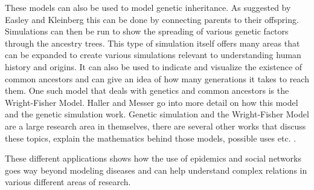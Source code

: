 These models can also be used to model genetic inheritance. As suggested by
Easley and Kleinberg \cite{networks} this can be done by connecting parents to their offspring.
Simulations can then be run to show the spreading of various genetic factors through
the ancestry trees. This type of simulation itself offers many areas that can be expanded
to create various simulations relevant to understanding human history and origins. 
It can also be used to indicate and visualize the existence of common ancestors and 
can give an idea of how many generations it takes to reach them. One such model that deals
with genetics and common ancestors is the Wright-Fisher Model. Haller and Messer \cite{genetics}
go into more detail on how this model and the genetic simulation work. Genetic simulation 
and the Wright-Fisher Model are a large research area in themselves, there are several other
works that discuss these topics, explain the mathematics behind those models, 
possible uses etc. \cite{genetics2} \cite{genetics3} \cite{genetics4}.


These different applications shows how the use of epidemics and social networks goes way beyond modeling diseases and can help understand complex relations in various different areas of research.